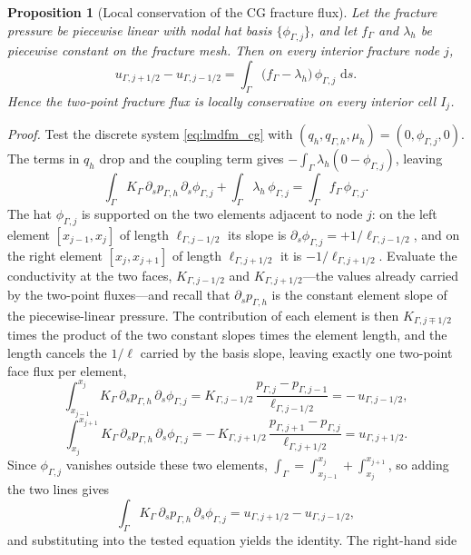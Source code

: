 \documentclass[a4paper,fleqn]{cas-sc}
\newcommand{\dd}{\,\mathrm{d}}
\newtheorem{proposition}[theorem]{Proposition}
\begin{document}
{\begin{proposition}[Local conservation of the CG fracture flux]
\label{prop:fracture-conservation}
Let the fracture pressure be piecewise linear with nodal hat basis
\(\{\phi_{\Gamma,j}\}\), and let \(f_\Gamma\) and \(\lambda_h\) be piecewise
constant on the fracture mesh. Then on every interior fracture node \(j\),
\[
  u_{\Gamma,j+1/2}-u_{\Gamma,j-1/2}
  =
  \int_\Gamma\bigl(f_\Gamma-\lambda_h\bigr)\,\phi_{\Gamma,j}\,\dd s .
\]
Hence the two-point fracture flux is locally conservative on every interior cell
\(I_j\).
\end{proposition}

\noindent\emph{Proof.}
Test the discrete system \eqref{eq:lmdfm_cg} with
\((q_h,q_{\Gamma,h},\mu_h)=(0,\phi_{\Gamma,j},0)\). The terms in \(q_h\) drop and the
coupling term gives \(-\int_\Gamma\lambda_h(0-\phi_{\Gamma,j})\), leaving
\[
  \int_\Gamma K_\Gamma\,\partial_s p_{\Gamma,h}\,\partial_s\phi_{\Gamma,j}
  +\int_\Gamma\lambda_h\,\phi_{\Gamma,j}
  =\int_\Gamma f_\Gamma\,\phi_{\Gamma,j}.
\]
The hat \(\phi_{\Gamma,j}\) is supported on the two elements adjacent to node \(j\):
on the left element \([x_{j-1},x_j]\) of length \(\ell_{\Gamma,j-1/2}\) its slope is
\(\partial_s\phi_{\Gamma,j}=+1/\ell_{\Gamma,j-1/2}\), and on the right element
\([x_j,x_{j+1}]\) of length \(\ell_{\Gamma,j+1/2}\) it is \(-1/\ell_{\Gamma,j+1/2}\).
Evaluate the conductivity at the two faces, \(K_{\Gamma,j-1/2}\) and
\(K_{\Gamma,j+1/2}\)---the values already carried by the two-point fluxes---and
recall that \(\partial_s p_{\Gamma,h}\) is the constant element slope of the
piecewise-linear pressure. The contribution of each element is then
\(K_{\Gamma,j\mp1/2}\) times the product of the two constant slopes times the element
length, and the length cancels the \(1/\ell\) carried by the basis slope, leaving
exactly one two-point face flux per element,
\[
  \int_{x_{j-1}}^{x_j} K_\Gamma\,\partial_s p_{\Gamma,h}\,\partial_s\phi_{\Gamma,j}
  =K_{\Gamma,j-1/2}\,\frac{p_{\Gamma,j}-p_{\Gamma,j-1}}{\ell_{\Gamma,j-1/2}}
  =-\,u_{\Gamma,j-1/2},
\]
\[
  \int_{x_j}^{x_{j+1}} K_\Gamma\,\partial_s p_{\Gamma,h}\,\partial_s\phi_{\Gamma,j}
  =-\,K_{\Gamma,j+1/2}\,\frac{p_{\Gamma,j+1}-p_{\Gamma,j}}{\ell_{\Gamma,j+1/2}}
  =u_{\Gamma,j+1/2}.
\]
Since \(\phi_{\Gamma,j}\) vanishes outside these two elements,
\(\int_\Gamma=\int_{x_{j-1}}^{x_j}+\int_{x_j}^{x_{j+1}}\), so adding the two lines
gives
\[
  \int_\Gamma K_\Gamma\,\partial_s p_{\Gamma,h}\,\partial_s\phi_{\Gamma,j}
  =u_{\Gamma,j+1/2}-u_{\Gamma,j-1/2},
\]
and substituting into the tested equation yields the identity. The right-hand side
}
\end{document}
